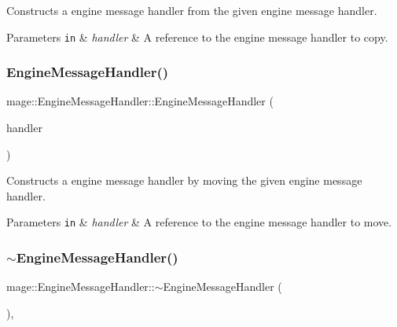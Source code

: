 Constructs a engine message handler from the given engine message handler.


\begin{DoxyParams}[1]{Parameters}
\mbox{\tt in}  & {\em handler} & A reference to the engine message handler to copy. \\
\hline
\end{DoxyParams}
\mbox{\label{classmage_1_1_engine_message_handler_ab771829274e6ab899b4499926f504667}} 
\subsubsection{\texorpdfstring{Engine\+Message\+Handler()}{EngineMessageHandler()}\hspace{0.1cm}{\footnotesize\ttfamily [3/3]}}
{\footnotesize\ttfamily mage\+::\+Engine\+Message\+Handler\+::\+Engine\+Message\+Handler (\begin{DoxyParamCaption}\item[{\mbox{\hyperlink{classmage_1_1_engine_message_handler}{Engine\+Message\+Handler}} \&\&}]{handler }\end{DoxyParamCaption})\hspace{0.3cm}{\ttfamily [noexcept]}}

Constructs a engine message handler by moving the given engine message handler.


\begin{DoxyParams}[1]{Parameters}
\mbox{\tt in}  & {\em handler} & A reference to the engine message handler to move. \\
\hline
\end{DoxyParams}
\mbox{\label{classmage_1_1_engine_message_handler_a458f16ad9f68ad1e908e4d275c383c2c}} 
\subsubsection{\texorpdfstring{$\sim$\+Engine\+Message\+Handler()}{~EngineMessageHandler()}}
{\footnotesize\ttfamily mage\+::\+Engine\+Message\+Handler\+::$\sim$\+Engine\+Message\+Handler (\begin{DoxyParamCaption}{ }\end{DoxyParamCaption})\hspace{0.3cm}{\ttfamily [virtual]}, {\ttfamily [default]}}

